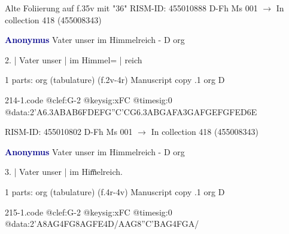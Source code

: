 \documentclass[twocolumn]{book}
\begin{document}
\newline Alte Foliierung auf f.35v mit "36"
\newline RISM-ID: 455010888
\newline D-Fh  Ms 001
\newline $\rightarrow$ In collection 418 (455008343)
      
\newline \par \vspace{7pt} \textcolor{darkblue}{\textbf{Anonymus  }}
\newline Vater unser im Himmelreich - D
\newline org
\newline \begin{itshape}[f.2v, at left:] 2. | Vater unser | im Himmel= | reich\end{itshape} 
\newline \textcolor{darkblue}{}  1 parts: org (tabulature)  (f.2v-4r)
\newline Manuscript copy
.1  org  D  
\begin{filecontents*}{214-1.code}
@clef:G-2
@keysig:xFC
@timesig:0
@data:2'A{6.3ABAB}{6FDEF}{G''C'CG}{6.3ABGA}{FA}{3GAFG}{EFGF}{ED6E}
\end{filecontents*}
\newline
%

\newline RISM-ID: 455010802
\newline D-Fh  Ms 001
\newline $\rightarrow$ In collection 418 (455008343)
      
\newline \par \vspace{7pt} \textcolor{darkblue}{\textbf{Anonymus  }}
\newline Vater unser im Himmelreich - D
\newline org
\newline \begin{itshape}[f.4r, at left:] 3. | Vater unser | im Him̅elreich.\end{itshape} 
\newline \textcolor{darkblue}{}  1 parts: org (tabulature)  (f.4r-4v)
\newline Manuscript copy
.1  org  D  
\begin{filecontents*}{215-1.code}
@clef:G-2
@keysig:xFC
@timesig:0
@data:2'A{8AG}4FG{8AG}{FE}4D/AAG{8''C'BAG}4FGA/
\end{filecontents*}
\newline
%
\end{document}
